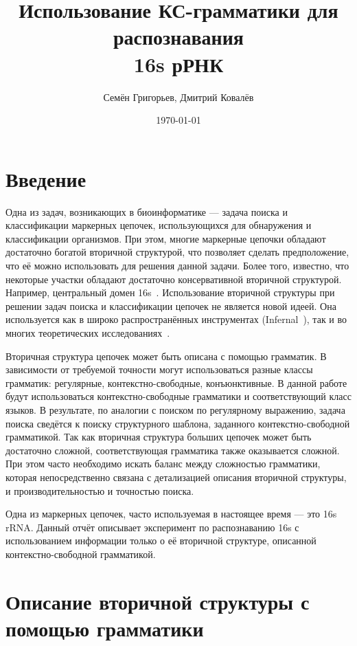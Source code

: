 \documentclass[12pt]{article}  %
\title{Использование КС-грамматики для распознавания \\ 16s рРНК}
\author{Семён Григорьев, Дмитрий Ковалёв}
\date{\today}
\theoremstyle{remark}
\begin{document}

\maketitle 

\section{Введение}

Одна из задач, возникающих в биоинформатике --- задача поиска и классификации маркерных цепочек, использующихся для обнаружения и классификации организмов.
При этом, многие маркерные цепочки обладают достаточно богатой вторичной структурой, что позволяет сделать предположение, что её можно использовать для решения данной задачи.
Более того, известно, что некоторые участки обладают достаточно консервативной вторичной структурой.
Например, центральный домен 16s~\cite{!!!}.
Использование вторичной структуры при решении задач поиска и классификации цепочек не является новой идеей.
Она используется как в широко распространённых инструментах (Infernal~\cite{!!!}), так и во многих теоретических исследованиях~\cite{!!!,!!!,!!!}.

Вторичная структура цепочек может быть описана с помощью грамматик. 
В зависимости от требуемой точности могут использоваться разные классы грамматик: регулярные, контекстно-свободные, конъюнктивные.
В данной работе будут использоваться контекстно-свободные грамматики и соответствующий класс языков.
В результате, по аналогии с поиском по регулярному выражению, задача поиска сведётся к поиску структурного шаблона, заданного контекстно-свободной грамматикой.
Так как вторичная структура больших цепочек может быть достаточно сложной, соответствующая грамматика также оказывается сложной.
При этом часто необходимо искать баланс между сложностью грамматики, которая непосредственно связана с детализацией описания вторичной структуры, и производительностью и точностью поиска.

Одна из маркерных цепочек, часто используемая в настоящее время --- это 16s rRNA.
Данный отчёт описывает эксперимент по распознаванию 16s с использованием информации только о её вторичной структуре, описанной контекстно-свободной грамматикой.

\section{Описание вторичной структуры с помощью грамматики}
\end{document}
